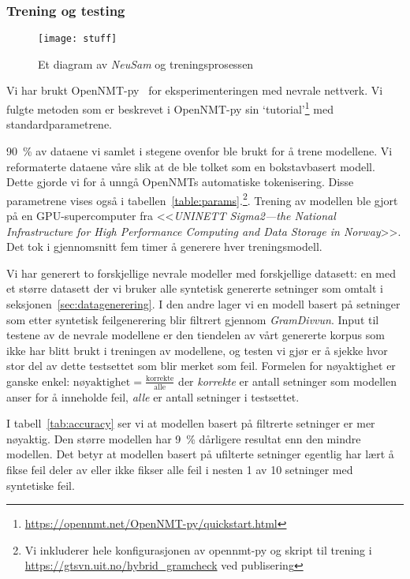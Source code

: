 \documentclass{flammie}
\begin{document}
\subsubsection{Trening og testing}

\begin{figure}
   \centering
   \texttt{[image: stuff]}
   \caption{Et diagram av \textit{NeuSam} og treningsprosessen\label{fig:my_label}}
\end{figure}

Vi har brukt OpenNMT-py~\cite{klein2017opennmt} for eksperimenteringen
med nevrale nettverk. Vi fulgte metoden som er beskrevet i OpenNMT-py sin
`tutorial'\footnote{\url{https://opennmt.net/OpenNMT-py/quickstart.html}} med
standardparametrene.

90~\% av dataene vi samlet i stegene ovenfor ble brukt for å trene modellene. Vi
reformaterte dataene våre slik at de ble tolket som en bokstavbasert modell.
Dette gjorde vi for å unngå OpenNMTs automatiske tokenisering. Disse parametrene
vises også i tabellen~\ref{table:params}.\footnote{Vi inkluderer hele
konfigurasjonen av opennmt-py og skript til trening i
\url{https://gtsvn.uit.no/hybrid_gramcheck} ved publisering}. Trening av
modellen ble gjort på en GPU-supercomputer fra <<\textit{UNINETT Sigma2---the
National Infrastructure for High Performance Computing and Data Storage in
Norway}>>. Det tok i gjennomsnitt fem timer å generere hver treningsmodell.

Vi har generert to forskjellige nevrale modeller med forskjellige datasett: en
med et større datasett der vi bruker alle syntetisk genererte setninger som
omtalt i seksjonen~\ref{sec:datagenerering}. I den andre lager vi en modell
basert på setninger som etter syntetisk feilgenerering blir filtrert gjennom
\textit{GramDivvun}.  Input til testene av de nevrale modellene er den tiendelen
av vårt genererte korpus som ikke har blitt brukt i treningen av modellene, og
testen vi gjør er å sjekke hvor stor del av dette testsettet som blir merket som
feil. Formelen for nøyaktighet er ganske enkel:
$\mathrm{nøyaktighet}=\frac{\mathrm{korrekte}}{\mathrm{alle}}$ der
\textit{korrekte} er antall setninger som modellen anser for å inneholde feil,
\textit{alle} er antall setninger i testsettet.


I tabell~\ref{tab:accuracy} ser vi at modellen basert på filtrerte setninger er
mer nøyaktig.  Den større modellen har 9~\% dårligere resultat enn den mindre
modellen.  Det betyr at modellen basert på ufilterte setninger egentlig har lært
å fikse feil deler av eller ikke fikser alle feil i nesten 1 av 10 setninger med
syntetiske feil.
\end{document}
